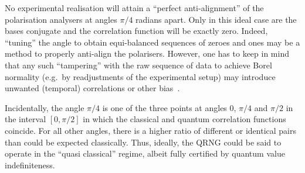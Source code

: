 \documentclass{mscs}
\begin{document}
No experimental realisation will attain a ``perfect anti-alignment'' of the polarisation analysers  at angles $\pi /4$ radians apart.
Only in this ideal case are the bases conjugate and the correlation function will be exactly zero.
Indeed, ``tuning'' the angle to obtain equi-balanced sequences of zeroes and ones may be a method to properly anti-align the polarisers.
However, one has to keep in mind that any such ``tampering'' with the raw sequence of data
to achieve  Borel normality (e.g.\ by readjustments of the experimental setup)
may introduce unwanted (temporal) correlations or other bias~\citep{PhysRevA.82.022102}.


Incidentally, the angle $\pi /4$ is one of the three points at angles $0$, $\pi /4$ and $\pi /2$ in the interval $[0, \pi /2]$
in which the classical and quantum correlation functions coincide.
For all other angles, there is a higher ratio of different or identical pairs than could be expected classically.
Thus, ideally, the QRNG could be said to operate in the ``quasi classical'' regime,
albeit fully certified by quantum value indefiniteness.
\end{document}
